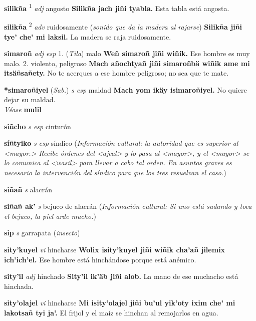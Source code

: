 \documentclass[10pt]{scrbook}
\newcommand{\entry}[1]{\textbf{#1}}
\newcommand{\onedefinition}[1]{#1.}
\newcommand{\defsuperscript}[1]{\textsuperscript{#1}}
\newcommand{\partofspeech}[1]{\textit{#1}}
\newcommand{\spanishtranslation}[1]{#1}
\newcommand{\clarification}[1]{(\textit{#1})}
\newcommand{\cholexample}[1]{\textbf{#1}}
\newcommand{\exampletranslation}[1]{#1}
\newcommand{\alsosee}[1]{\\\textit{Véase} \textbf{#1}}
\newcommand{\relevantdialect}[1]{(\textit{#1})}
\newcommand{\culturalinformation}[1]{(\textit{#1})}
\begin{document}
\begin{multicols}{2}
\entry{silikña}
\defsuperscript{1}
\partofspeech{adj}
\spanishtranslation{angosto}
\cholexample{Silikña jach jiñi tyabla.}
\exampletranslation{Esta tabla está angosta.}

\entry{silikña}
\defsuperscript{2}
\partofspeech{adv}
\spanishtranslation{ruidosamente}
\clarification{sonido que da la madera al rajarse}
\cholexample{Silikña jiñi tye' che' mi laksil.}
\exampletranslation{La madera se raja ruidosamente.}

\entry{simaroñ}
\partofspeech{adj esp}
\onedefinition{1}
\relevantdialect{Tila}
\spanishtranslation{malo}
\cholexample{Weñ simaroñ jiñi wiñik.}
\exampletranslation{Ese hombre es muy malo.}
\onedefinition{2}
\spanishtranslation{violento, peligroso}
\cholexample{Mach añochtyañ jiñi simaroñbä wiñik ame mi itsäñsañety.}
\exampletranslation{No te acerques a ese hombre peligroso; no sea que te mate.}

\entry{*simaroñiyel}
\relevantdialect{Sab.}
\partofspeech{s esp}
\spanishtranslation{maldad}
\cholexample{Mach yom ikäy isimaroñiyel.}
\exampletranslation{No quiere dejar su maldad.}
\alsosee{mulil}

\entry{siñcho}
\partofspeech{s esp}
\spanishtranslation{cinturón}

\entry{síñtyiko}
\partofspeech{s esp}
\spanishtranslation{síndico}
\culturalinformation{Información cultural: la autoridad que es superior al <mayor.> Recibe órdenes del <ajcal> y lo pasa al <mayor>, y el <mayor> se lo comunica al <wasil> para llevar a cabo tal orden. En asuntos graves es necesario la intervención del síndico para que los tres resuelvan el caso.}

\entry{siñañ}
\partofspeech{s}
\spanishtranslation{alacrán}

\entry{siñañ ak'}
\partofspeech{s}
\spanishtranslation{bejuco de alacrán}
\culturalinformation{Información cultural: Si uno está sudando y toca el bejuco, la piel arde mucho.}

\entry{sip}
\partofspeech{s}
\spanishtranslation{garrapata}
\clarification{insecto}

\entry{sity'kuyel}
\partofspeech{vi}
\spanishtranslation{hincharse}
\cholexample{Wolix isity'kuyel jiñi wiñik cha'añ jilemix ich'ich'el.}
\exampletranslation{Ese hombre está hinchándose porque está anémico.}

\entry{sity'il}
\partofspeech{adj}
\spanishtranslation{hinchado}
\cholexample{Sity'il ik'äb jiñi alob.}
\exampletranslation{La mano de ese muchacho está hinchada.}

\entry{sity'olajel}
\partofspeech{vi}
\spanishtranslation{hincharse}
\cholexample{Mi isity'olajel jiñi bu'ul yik'oty ixim che' mi lakotsañ tyi ja'.}
\exampletranslation{El frijol y el maíz se hinchan al remojarlos en agua.}


\end{multicols}
\end{document}
